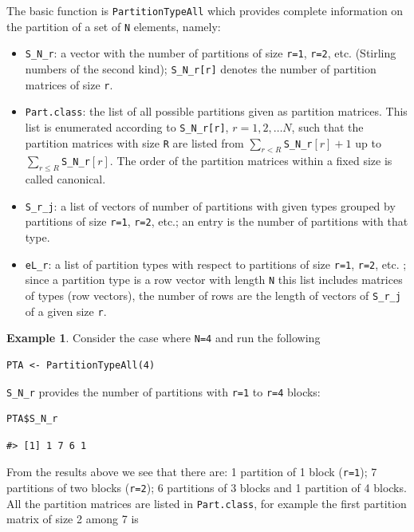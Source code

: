 The basic function is \texttt{PartitionTypeAll} which provides complete information on the partition of a set of \texttt{N} elements, namely:

\begin{itemize}
\item
  \texttt{S\_N\_r}: a vector with the number of partitions of size \texttt{r=1}, \texttt{r=2}, etc. (Stirling numbers of the second kind); \texttt{S\_N\_r{[}r{]}} denotes the number of partition matrices
  of size \texttt{r}.
\item
  \texttt{Part.class}: the list of all possible partitions given as partition matrices. This list is enumerated according to \texttt{S\_N\_r{[}r{]}}, \(r=1,2,\ldots N\), such that the partition matrices with
  size \texttt{R} are listed from \(\sum_{r<R}\)\texttt{S\_N\_r}\(\left[ r\right] +1\) up to \(\sum_{r\leq R}\)\texttt{S\_N\_r}\(\left[ r\right]\). The order of the
  partition matrices within a fixed size is called canonical.
\item
  \texttt{S\_r\_j}: a list of vectors of number of partitions with given types grouped by partitions of size \texttt{r=1}, \texttt{r=2}, etc.; an entry is the number of partitions with that type.
\item
  \texttt{eL\_r}: a list of partition types with respect to partitions of size \texttt{r=1}, \texttt{r=2}, etc. ; since a partition type is a row
  vector with length \texttt{N} this list includes matrices of types (row vectors), the number of rows are the length of vectors of \texttt{S\_r\_j} of a given size \texttt{r}.
\end{itemize}

\textbf{Example 1}. Consider the case where \texttt{N=4} and run the following

\begin{verbatim}
PTA <- PartitionTypeAll(4)
\end{verbatim}

\texttt{S\_N\_r} provides the number of partitions with \texttt{r=1} to \texttt{r=4} blocks:

\begin{verbatim}
PTA$S_N_r
\end{verbatim}

\begin{verbatim}
#> [1] 1 7 6 1
\end{verbatim}

From the results above we see that there are: 1 partition of 1 block (\texttt{r=1}); 7 partitions of two blocks (\texttt{r=2}); 6 partitions of 3 blocks and 1 partition of 4 blocks.
All the partition matrices are listed in \texttt{Part.class}, for example the first partition matrix of size 2 among 7 is

